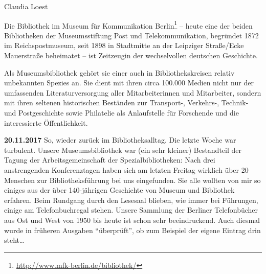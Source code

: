 \documentclass[a4paper,
fontsize=11pt,
oneside,
numbers=noperiodatend,
parskip=half-,
bibliography=totoc,
final
]{scrartcl}
\begin{document}
Claudia Loest

Die Bibliothek im Museum für Kommunikation Berlin\footnote{\url{http://www.mfk-berlin.de/bibliothek/}}
-- heute eine der beiden Bibliotheken der Museumsstiftung Post und
Telekommunikation, begründet 1872 im Reichspostmuseum, seit 1898 in
Stadtmitte an der Leipziger Straße/Ecke Mauerstraße beheimatet -- ist
Zeitzeugin der wechselvollen deutschen Geschichte.

Als Museumsbibliothek gehört sie einer auch in Bibliothekskreisen
relativ unbekannten Spezies an. Sie dient mit ihren circa 100.000 Medien
nicht nur der umfassenden Literaturversorgung aller Mitarbeiterinnen und
Mitarbeiter, sondern mit ihren seltenen historischen Beständen zur
Transport-, Verkehrs-, Technik- und Postgeschichte sowie Philatelie als
Anlaufstelle für Forschende und die interessierte Öffentlichkeit.

\textbf{20.11.2017} So, wieder zurück im Bibliotheksalltag. Die letzte
Woche war turbulent. Unsere Museumsbibliothek war (ein sehr kleiner)
Bestandteil der Tagung der Arbeitsgemeinschaft der Spezialbibliotheken:
Nach drei anstrengenden Konferenztagen haben sich am letzten Freitag
wirklich über 20 Menschen zur Bibliotheksführung bei uns eingefunden.
Sie alle wollten von mir so einiges aus der über 140-jährigen Geschichte
von Museum und Bibliothek erfahren. Beim Rundgang durch den Lesesaal
blieben, wie immer bei Führungen, einige am Telefonbuchregal stehen.
Unsere Sammlung der Berliner Telefonbücher aus Ost und West von 1950 bis
heute ist schon sehr beeindruckend. Auch diesmal wurde in früheren
Ausgaben \enquote{überprüft}, ob zum Beispiel der eigene Eintrag drin
steht\ldots{}
\end{document}
